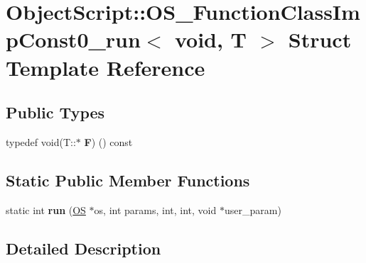 \hypertarget{struct_object_script_1_1_o_s___function_class_imp_const0__run_3_01void_00_01_t_01_01_01_01_01_01307f28bf02ecd7b8bad28662c5b6a372}{}\section{Object\+Script\+:\+:O\+S\+\_\+\+Function\+Class\+Imp\+Const0\+\_\+run$<$ void, T $>$ Struct Template Reference}
\label{struct_object_script_1_1_o_s___function_class_imp_const0__run_3_01void_00_01_t_01_01_01_01_01_01307f28bf02ecd7b8bad28662c5b6a372}
\subsection*{Public Types}
\begin{DoxyCompactItemize}
\item 
typedef void(T\+::$\ast$ {\bfseries F}) () const \hypertarget{struct_object_script_1_1_o_s___function_class_imp_const0__run_3_01void_00_01_t_01_01_01_01_01_01307f28bf02ecd7b8bad28662c5b6a372_a928cf6c3e31cb3d588fa1bcf960f515e}{}\label{struct_object_script_1_1_o_s___function_class_imp_const0__run_3_01void_00_01_t_01_01_01_01_01_01307f28bf02ecd7b8bad28662c5b6a372_a928cf6c3e31cb3d588fa1bcf960f515e}

\end{DoxyCompactItemize}
\subsection*{Static Public Member Functions}
\begin{DoxyCompactItemize}
\item 
static int {\bfseries run} (\hyperlink{class_object_script_1_1_o_s}{OS} $\ast$os, int params, int, int, void $\ast$user\+\_\+param)\hypertarget{struct_object_script_1_1_o_s___function_class_imp_const0__run_3_01void_00_01_t_01_01_01_01_01_01307f28bf02ecd7b8bad28662c5b6a372_ad84dbeb026573884d692a04afdf96c90}{}\label{struct_object_script_1_1_o_s___function_class_imp_const0__run_3_01void_00_01_t_01_01_01_01_01_01307f28bf02ecd7b8bad28662c5b6a372_ad84dbeb026573884d692a04afdf96c90}

\end{DoxyCompactItemize}


\subsection{Detailed Description}
